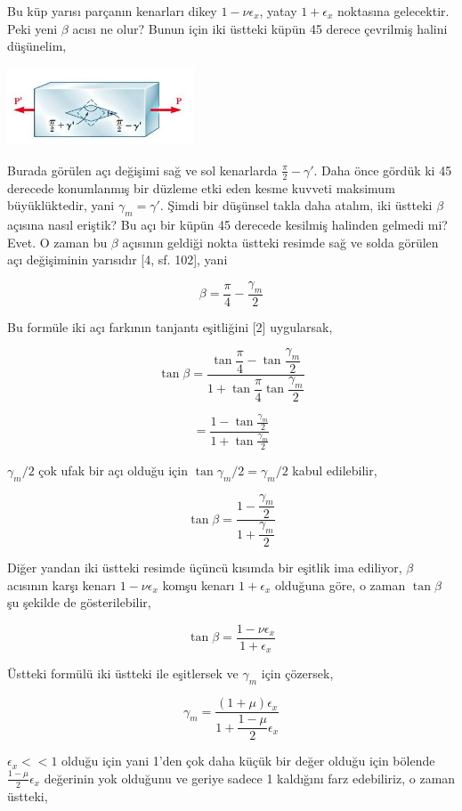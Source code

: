 \documentclass[12pt,fleqn]{article}\usepackage{../../common}
\begin{document}
Bu küp yarısı parçanın kenarları dikey $1-\nu \epsilon_x$, yatay $1 + \epsilon_x$
noktasına gelecektir. Peki yeni $\beta$ acısı ne olur? Bunun için iki
üstteki küpün 45 derece çevrilmiş halini düşünelim,

\includegraphics[width=15em]{phy_020_strs_06_09.jpg}

Burada görülen açı değişimi sağ ve sol kenarlarda $\frac{\pi}{2} - \gamma'$.
Daha önce gördük ki 45 derecede konumlanmış bir düzleme etki eden kesme
kuvveti maksimum büyüklüktedir, yani $\gamma_m = \gamma'$. Şimdi bir düşünsel
takla daha atalım, iki üstteki $\beta$ açısına nasıl eriştik? Bu açı bir küpün
45 derecede kesilmiş halinden gelmedi mi? Evet. O zaman bu $\beta$ açısının
geldiği nokta üstteki resimde sağ ve solda görülen açı değişiminin yarısıdır
[4, sf. 102], yani

$$
\beta = \frac{\pi}{4} - \frac{\gamma_m}{2}
$$

Bu formüle iki açı farkının tanjantı eşitliğini [2] uygularsak,

$$
\tan \beta =
\dfrac{\tan \dfrac{\pi}{4} - \tan \dfrac{\gamma_m}{2}}
      {1 + \tan \dfrac{\pi}{4} \tan \dfrac{\gamma_m}{2}}
$$

$$
= \frac{1 - \tan \frac{\gamma_m}{2}}{1 + \tan \frac{\gamma_m}{2} }
$$

$\gamma_m / 2$ çok ufak bir açı olduğu için $\tan \gamma_m / 2 = \gamma_m / 2$
kabul edilebilir,

$$
\tan \beta = \dfrac{1 - \dfrac{\gamma_m}{2}}{1 + \dfrac{\gamma_m}{2}}
$$

Diğer yandan iki üstteki resimde üçüncü kısımda bir eşitlik ima ediliyor,
$\beta$ acısının karşı kenarı $1 - \nu \epsilon_x$ komşu kenarı $1 +
\epsilon_x$ olduğuna göre, o zaman $\tan\beta$ şu şekilde de gösterilebilir,

$$
\tan\beta = \frac{1 - \nu \epsilon_x}{1 + \epsilon_x}
$$

Üstteki formülü iki üstteki ile eşitlersek ve $\gamma_m$ için çözersek,

$$
\gamma_m = \dfrac{(1+\mu)\epsilon_x}{ 1 + \dfrac{1-\mu}{2} \epsilon_x}
$$

$\epsilon_x << 1$ olduğu için yani 1'den çok daha küçük bir değer olduğu için
bölende $\frac{1-\mu}{2} \epsilon_x$ değerinin yok olduğunu ve geriye
sadece 1 kaldığını farz edebiliriz, o zaman üstteki,
\end{document}

